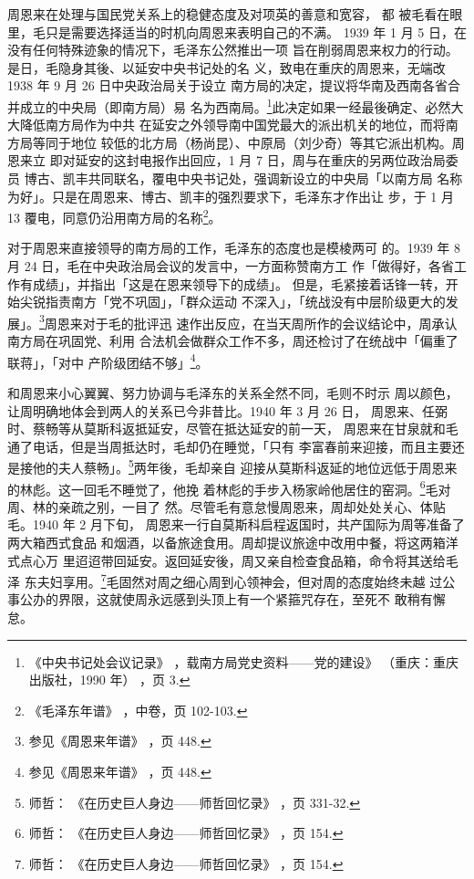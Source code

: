 周恩来在处理与国民党关系上的稳健态度及对项英的善意和宽容，
都
被毛看在眼里，毛只是需要选择适当的时机向周恩来表明自己的不满。
1939 年 1 月 5 日，在没有任何特殊迹象的情况下，毛泽东公然推出一项
旨在削弱周恩来权力的行动。是日，毛隐身其後、以延安中央书记处的名
义，致电在重庆的周恩来，无端改 1938 年 9 月 26 日中央政治局关于设立
南方局的决定，提议将华南及西南各省合并成立的中央局（即南方局）易
名为西南局。\footnote{《中央书记处会议记录》
，载南方局党史资料——党的建设》
（重庆：重庆出版社，1990 年）
，页 3.}此决定如果一经最後确定、必然大大降低南方局作为中共
在延安之外领导南中国党最大的派出机关的地位，而将南方局等同于地位
较低的北方局（杨尚昆）、中原局（刘少奇）等其它派出机构。周恩来立
即对延安的这封电报作出回应，1 月 7 日，周与在重庆的另两位政治局委员
博古、凯丰共同联名，覆电中央书记处，强调新设立的中央局「以南方局
名称为好」。只是在周恩来、博古、凯丰的强烈要求下，毛泽东才作出让
步，于 1 月 13 覆电，同意仍沿用南方局的名称\footnote{《毛泽东年谱》
，中卷，页 102-103.}。

对于周恩来直接领导的南方局的工作，毛泽东的态度也是模棱两可
的。1939 年 8 月 24 日，毛在中央政治局会议的发言中，一方面称赞南方工
作「做得好，各省工作有成绩」，并指出「这是在恩来领导下的成绩」。
但是，毛紧接着话锋一转，开始尖锐指责南方「党不巩固」，「群众运动
不深入」，「统战没有中层阶级更大的发展」。\footnote{参见《周恩来年谱》
，页 448.}周恩来对于毛的批评迅
速作出反应，在当天周所作的会议结论中，周承认南方局在巩固党、利用
合法机会做群众工作不多，周还检讨了在统战中「偏重了联蒋」，「对中
产阶级团结不够」\footnote{参见《周恩来年谱》
，页 448.}。

和周恩来小心翼翼、努力协调与毛泽东的关系全然不同，毛则不时示
周以颜色，让周明确地体会到两人的关系已今非昔比。1940 年 3 月 26 日，
周恩来、任弼时、蔡畅等从莫斯科返抵延安，尽管在抵达延安的前一天，
周恩来在甘泉就和毛通了电话，但是当周抵达时，毛却仍在睡觉，「只有
李富春前来迎接，而且主要还是接他的夫人蔡畅」。\footnote{师哲：
《在历史巨人身边——师哲回忆录》
，页 331-32.}两年後，毛却亲自
迎接从莫斯科返延的地位远低于周恩来的林彪。这一回毛不睡觉了，他挽
着林彪的手步入杨家岭他居住的窑洞。\footnote{师哲：
《在历史巨人身边——师哲回忆录》
，页 154.}毛对周、林的亲疏之别，一目了
然。尽管毛有意怠慢周恩来，周却处处关心、体贴毛。1940 年 2 月下旬，
周恩来一行自莫斯科启程返国时，共产国际为周等准备了两大箱西式食品
和烟酒，以备旅途食用。周却提议旅途中改用中餐，将这两箱洋式点心万
里迢迢带回延安。返回延安後，周又亲自检查食品箱，命令将其送给毛泽
东夫妇享用。\footnote{师哲：
《在历史巨人身边——师哲回忆录》
，页 154.}毛固然对周之细心周到心领神会，但对周的态度始终未越
过公事公办的界限，这就使周永远感到头顶上有一个紧箍咒存在，至死不
敢稍有懈怠。


